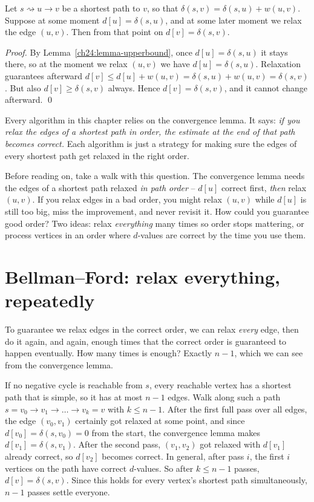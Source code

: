 \begin{lemma}[Convergence]\label{ch24:lemma-convergence}
Let $s \rightsquigarrow u \to v$ be a shortest path to $v$, so that
$\delta(s,v) = \delta(s,u) + w(u,v)$. Suppose at some moment $d[u] = \delta(s,u)$,
and at some later moment we relax the edge $(u,v)$. Then from that point on
$d[v] = \delta(s,v)$.
\end{lemma}

\begin{formalbox}
\emph{Proof.} By Lemma~\ref{ch24:lemma-upperbound}, once $d[u]=\delta(s,u)$ it
stays there, so at the moment we relax $(u,v)$ we have $d[u]=\delta(s,u)$.
Relaxation guarantees afterward $d[v] \le d[u]+w(u,v) = \delta(s,u)+w(u,v) =
\delta(s,v)$. But also $d[v]\ge\delta(s,v)$ always. Hence $d[v]=\delta(s,v)$, and
it cannot change afterward. \qed
\end{formalbox}

Every algorithm in this chapter relies on the convergence lemma. It says: \emph{if you
relax the edges of a shortest path in order, the estimate at the end of that path
becomes correct.} Each algorithm is just a strategy for making sure the edges of
every shortest path get relaxed in the right order.

\begin{walkbox}
Before reading on, take a walk with this question. The convergence lemma needs the
edges of a shortest path relaxed \emph{in path order} -- $d[u]$ correct first,
\emph{then} relax $(u,v)$. If you relax edges in a bad order, you might relax
$(u,v)$ while $d[u]$ is still too big, miss the improvement, and never revisit it.
How could you guarantee good order? Two ideas: relax \emph{everything} many times
so order stops mattering, or process vertices in an order where
$d$-values are correct by the time you use them.
\end{walkbox}

\section{Bellman--Ford: relax everything, repeatedly}

To guarantee we relax edges in the correct order, we can relax \emph{every}
edge, then do it again, and again, enough times that the correct order is guaranteed to happen eventually.
How many times is enough? Exactly $n-1$, which we can see from the convergence
lemma.

If no negative cycle is reachable from $s$, every reachable vertex has a
shortest path that is simple, so it has at most $n-1$ edges. Walk along such a path
$s = v_0 \to v_1 \to \dots \to v_k = v$ with $k \le n-1$. After the first full
pass over all edges, the edge $(v_0,v_1)$ certainly got relaxed at some point, and
since $d[v_0]=\delta(s,v_0)=0$ from the start, the convergence lemma makes
$d[v_1]=\delta(s,v_1)$. After the second pass, $(v_1,v_2)$ got relaxed with $d[v_1]$
already correct, so $d[v_2]$ becomes correct. In general, after pass $i$, the
first $i$ vertices on the path have correct $d$-values. So after $k \le n-1$
passes, $d[v]=\delta(s,v)$. Since this holds for every vertex's shortest path
simultaneously, $n-1$ passes settle everyone.

